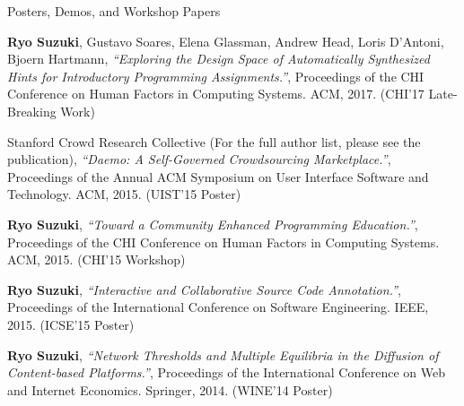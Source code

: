 \documentclass{resume} %
\begin{document}
\begin{rSection}{Posters, Demos, and Workshop Papers}

{\bf Ryo Suzuki}, Gustavo Soares, Elena Glassman, Andrew Head, Loris D’Antoni, Bjoern Hartmann,
{\it ``Exploring the Design Space of Automatically Synthesized Hints for Introductory Programming Assignments.''},
Proceedings of the CHI Conference on Human Factors in Computing Systems. ACM, 2017. (CHI'17 Late-Breaking Work)

Stanford Crowd Research Collective (For the full author list, please see the publication), 
{\it ``Daemo: A Self-Governed Crowdsourcing Marketplace.''},
Proceedings of the Annual ACM Symposium on User Interface Software and Technology. ACM, 2015. (UIST'15 Poster)

{\bf Ryo Suzuki}, 
{\it ``Toward a Community Enhanced Programming Education.''}, 
Proceedings of the CHI Conference on Human Factors in Computing Systems. ACM, 2015. (CHI'15 Workshop)

{\bf Ryo Suzuki}, 
{\it ``Interactive and Collaborative Source Code Annotation.''}, 
Proceedings of the International Conference on Software Engineering. IEEE, 2015. (ICSE'15 Poster)

{\bf Ryo Suzuki}, 
{\it ``Network Thresholds and Multiple Equilibria in the Diffusion of Content-based Platforms.''},
Proceedings of the International Conference on Web and Internet Economics. Springer, 2014. (WINE'14 Poster)


\end{rSection}
\end{document}
